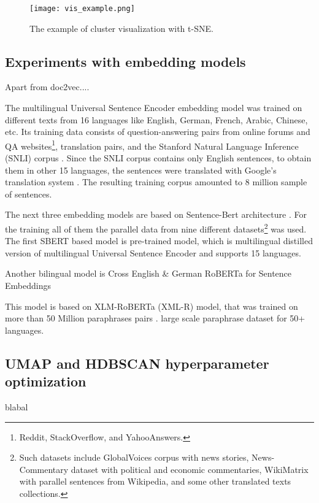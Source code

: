 \documentclass[fontsize=12pt,a4paper,twoside,openany]{scrbook}
\begin{document}
\begin{figure}[h]
\centering
\texttt{[image: vis\_example.png]}
\caption{The example of cluster visualization with t-SNE.}
\label{fig:cluster_vis}
\end{figure}


\subsection{Experiments with embedding models}
\label{sec:exp_emb}

Apart from doc2vec....


The multilingual Universal Sentence Encoder embedding model was trained on different texts from 16 languages like English, German, French, Arabic, Chinese, etc. Its training data consists of question-answering pairs from online forums and QA websites\footnote{Reddit, StackOverflow, and YahooAnswers.}, translation pairs, and the Stanford Natural Language Inference (SNLI) corpus \parencite{Cer18c}. Since the SNLI corpus contains only English sentences, to obtain them in other 15 languages, the sentences were translated with Google's translation system \parencite{Cer18c}. The resulting training corpus amounted to 8 million sample of sentences.

The next three embedding models are based on Sentence-Bert architecture \parencite{Reimers19}. For the training all of them the parallel data from nine different datasets\footnote{Such datasets include GlobalVoices corpus with news stories, News-Commentary dataset with political and economic commentaries, WikiMatrix with parallel sentences from Wikipedia, and some other translated texts collections.} was used. The first SBERT based model is  pre-trained model, which is multilingual distilled version of multilingual Universal Sentence Encoder and supports 15 languages. 


Another bilingual model is Cross English \& German RoBERTa for Sentence Embeddings


This model is based on XLM-RoBERTa (XML-R) model, that was trained on more than 50 Million paraphrases pairs \parencite{Reimers20}.
 large scale paraphrase dataset for 50+ languages. 







\subsection{UMAP and HDBSCAN hyperparameter optimization}
\label{sec:hypeparam}
blabal
\end{document}
